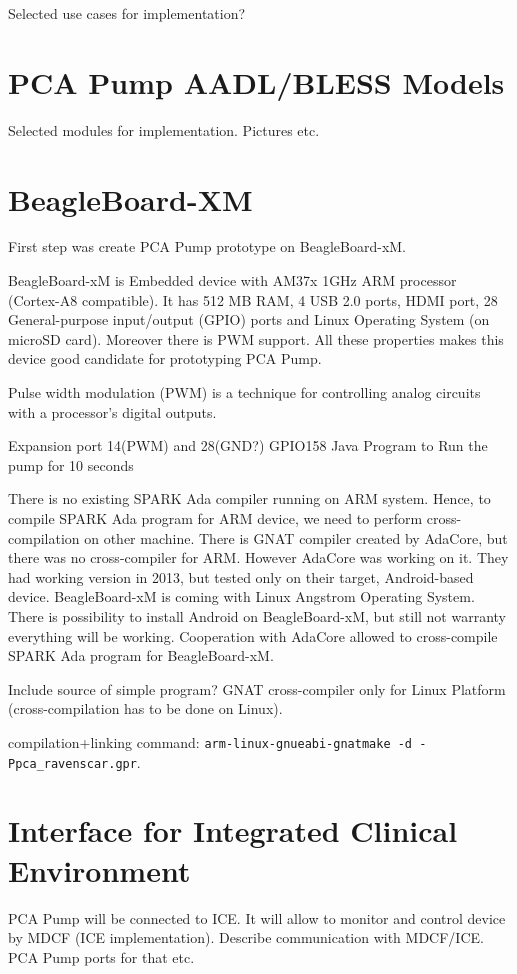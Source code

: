 Selected use cases for implementation?





\section{PCA Pump AADL/BLESS Models}
\label{pcapump:aadl-bless-models}
Selected modules for implementation. Pictures etc.



\section{BeagleBoard-XM}
\label{pcapump:beagleboard}
First step was create PCA Pump prototype on BeagleBoard-xM.

BeagleBoard-xM is Embedded device with AM37x 1GHz ARM processor (Cortex-A8 compatible). It has 512 MB RAM, 4 USB 2.0 ports, HDMI port, 28 General-purpose input/output (GPIO) ports and Linux Operating System (on microSD card). Moreover there is PWM support. All these properties makes this device good candidate for prototyping PCA Pump.

Pulse width modulation (PWM) is a technique for controlling analog circuits with a processor's digital outputs.

Expansion port 14(PWM) and 28(GND?)
GPIO158
Java Program to Run the pump for 10 seconds

There is no existing SPARK Ada compiler running on ARM system. Hence, to compile SPARK Ada program for ARM device, we need to perform cross-compilation on other machine. There is GNAT compiler \cite{Horn:Thesis} created by AdaCore, but there was no cross-compiler for ARM. However AdaCore was working on it. They had working version in 2013, but tested only on their target, Android-based device. BeagleBoard-xM is coming with Linux Angstrom Operating System. There is possibility to install Android on BeagleBoard-xM, but still not warranty everything will be working. Cooperation with AdaCore allowed to cross-compile SPARK Ada program for BeagleBoard-xM.

Include source of simple program?
GNAT cross-compiler only for Linux Platform (cross-compilation has to be done on Linux).

compilation+linking command: \lstinline{arm-linux-gnueabi-gnatmake -d -Ppca_ravenscar.gpr}.




\section{Interface for Integrated Clinical Environment}
\label{pcapump:implementation:ice}

PCA Pump will be connected to ICE. It will allow to monitor and control device by MDCF (ICE implementation).
Describe communication with MDCF/ICE. PCA Pump ports for that etc.